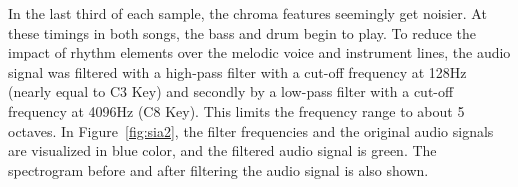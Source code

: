 \noindent In the last third of each sample, the chroma features seemingly get noisier. At these timings in both songs, the bass and drum begin to play. To reduce the impact of rhythm elements over the melodic voice and instrument lines, the audio signal was filtered with a high-pass filter with a cut-off frequency at 128Hz (nearly equal to C3 Key) and secondly by a low-pass filter with a cut-off frequency at 4096Hz (C8 Key). This limits the frequency range to about 5 octaves. 
In Figure~\ref{fig:sia2}, the filter frequencies and the original audio signals are visualized in blue color, and the filtered audio signal is green. The spectrogram before and after filtering the audio signal is also shown. 
\begin{figure}[htbp]
	\centering
\end{figure}
